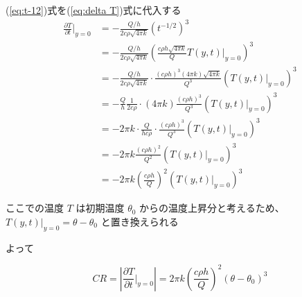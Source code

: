 \documentclass{article}
\begin{document}
(\ref{eq:t-12})式を(\ref{eq:delta T})式に代入する
\begin{align*}
\frac{\partial T}{\partial t}|_{y=0} &= -\frac{Q/h}{2c\rho\sqrt{4\pi k}} (t^{-1/2})^3 \\
&= -\frac{Q/h}{2c\rho\sqrt{4\pi k}} \left( \frac{c\rho h \sqrt{4\pi k}}{Q} T(y,t)|_{y=0} \right)^3 \\
&= -\frac{Q/h}{2c\rho\sqrt{4\pi k}} \cdot \frac{(c\rho h)^3 (4\pi k)\sqrt{4\pi k}}{Q^3} (T(y,t)|_{y=0})^3 \\
&= - \frac{Q}{h} \frac{1}{2c\rho} \cdot (4\pi k) \frac{(c\rho h)^3}{Q^3} (T(y,t)|_{y=0})^3 \\
&= -2\pi k \cdot \frac{Q}{h c\rho} \cdot \frac{(c\rho h)^3}{Q^3} (T(y,t)|_{y=0})^3 \\
&= -2\pi k \frac{(c\rho h)^2}{Q^2} (T(y,t)|_{y=0})^3 \\
&= -2\pi k \left( \frac{c\rho h}{Q} \right)^2 (T(y,t)|_{y=0})^3 \quad \text{}
\end{align*}


ここでの温度 $T$ は初期温度 $\theta_0$ からの温度上昇分と考えるため、$T(y,t)|_{y=0} = \theta - \theta_0$ と置き換えられる

よって

\begin{equation}
    CR = \left| \frac{\partial T}{\partial t}|_{y=0} \right| = 2\pi k \left( \frac{c\rho h}{Q} \right)^2 (\theta - \theta_0)^3
\end{equation}
\end{document}
